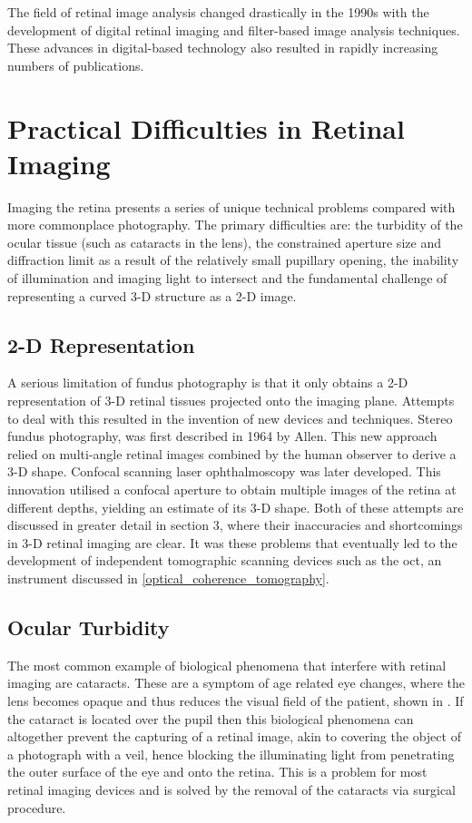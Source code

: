 The field of retinal image analysis changed drastically in the 1990s with
the development of digital retinal imaging and filter-based image analysis
techniques.  These advances in digital-based technology also resulted in
rapidly increasing numbers of publications.


\section{Practical Difficulties in Retinal Imaging}


Imaging the retina presents a series of unique technical problems compared
with more commonplace photography. The primary difficulties are: the turbidity
of the ocular tissue (such as cataracts in the lens), the constrained aperture
size and diffraction limit as a result of the relatively small pupillary opening,
the inability of illumination and imaging light to intersect and the fundamental
challenge of representing a curved 3-D structure as a 2-D image.

\subsection{2-D Representation}

A serious limitation of fundus photography is that it only obtains a 2-D
representation of 3-D retinal tissues projected onto the imaging plane.
Attempts to deal with this resulted in the invention of new devices and
techniques. Stereo fundus photography, was first described in 1964 by
Allen.\cite{allen1964ocular} This new approach relied on multi-angle
retinal images combined by the human observer to derive a 3-D shape.
Confocal scanning laser ophthalmoscopy was later developed. This
innovation utilised a confocal aperture to obtain multiple images of the
retina at different depths, yielding an estimate of its 3-D shape.\cite{webb1987confocal} Both of these attempts are discussed in greater detail in section 3,
where their inaccuracies and shortcomings in 3-D retinal imaging are
clear. It was these problems that eventually led to the development of
independent tomographic scanning devices such as the \gls{oct}, an
instrument discussed in \cref{optical_coherence_tomography}.

\subsection{Ocular Turbidity}

The most common example of biological phenomena that interfere with
retinal imaging are cataracts. These are a symptom of age related eye
changes, where the lens becomes opaque and thus reduces the visual
field of the patient, shown in . If the cataract is located over
the pupil then this biological phenomena can altogether prevent the capturing
of a retinal image, akin to covering the object of a photograph with a veil,
hence blocking the illuminating light from penetrating the outer surface of
the eye and onto the retina. This is a problem for most retinal imaging
devices and is solved by the removal of the cataracts via surgical procedure. 

